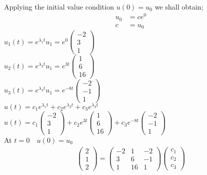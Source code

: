 \documentclass[12pt,a4paper]{article}
\begin{document}
\begin{itemize}
\begin{itemize}
\begin{align*}
\end{align*}
 Applying the initial value condition $u\left(0\right)=u_{0}$ we shall obtain;\\
\begin{align*}
u_{0}&=ce^{0}\\
c&=u_{0}
\end{align*}
$u_{1}(t)=e^{\lambda_{1}t}u_{1}=e^{0}\begin{pmatrix} -2 \\ 3 \\1 \end{pmatrix}$\\
$u_{2}(t)=e^{\lambda_{2}t}u_{1}=e^{3t}\begin{pmatrix} 1 \\ 6 \\16 \end{pmatrix}$\\
$u_{3}(t)=e^{\lambda_{3}t}u_{1}=e^{-8t}\begin{pmatrix} -2 \\ -1 \\1 \end{pmatrix}$\\
$u\left(t\right)=c_{1}e^{\lambda_{1} t}+c_{2}e^{\lambda_{2} t}+c_{3}e^{\lambda_{3} t}$\\
$u\left(t\right)=c_{1}\begin{pmatrix} -2 \\ 3 \\1 \end{pmatrix}+c_{2}e^{3t}\begin{pmatrix} 1 \\ 6 \\16 \end{pmatrix}+c_{3}e^{-8t}\begin{pmatrix} -2 \\ -1 \\1 \end{pmatrix}$\\
At $t=0 \quad u\left(0\right)=u_{0}$\\
\begin{align}
\begin{pmatrix} 2 \\ 1 \\2 \end{pmatrix}=
\begin{pmatrix} -2 & 1 &-2 \\ 3 & 6& -1\\1 &16&1 \end{pmatrix} \begin{pmatrix} c_{1} \\ c_{2}\\c_{3} \end{pmatrix}

\end{align}
\end{itemize}
\end{itemize}
\end{document}
